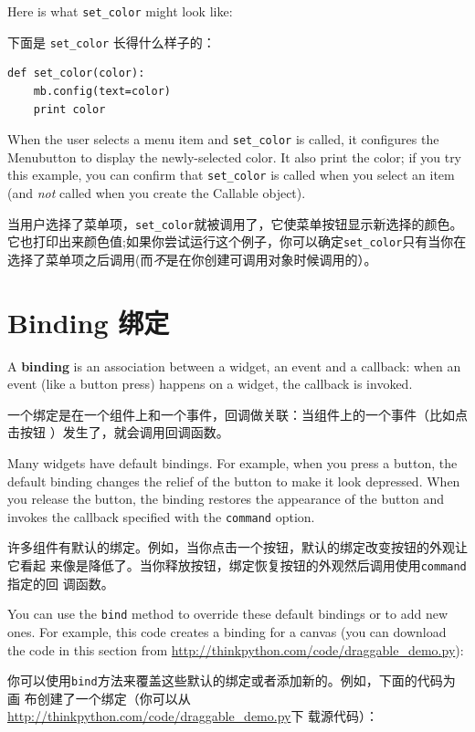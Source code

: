 \documentclass[10pt]{book}
\begin{document}
\begin{CJK}{UTF8}{gbsn}
Here is what \verb"set_color" might look like:

下面是 \verb"set_color" 长得什么样子的：

\begin{verbatim}
def set_color(color):
    mb.config(text=color)
    print color
\end{verbatim}
%
When the user selects a menu item and \verb"set_color" is called,
it configures the Menubutton to display the newly-selected color.
It also print the color; if you try this example, you can confirm that
\verb"set_color" is called when you select an item (and {\em not}
called when you create the Callable object).

当用户选择了菜单项，\verb"set_color"就被调用了，它使菜单按钮显示新选择的颜色。
它也打印出来颜色值;如果你尝试运行这个例子，你可以确定\verb"set_color"只有当你在
选择了菜单项之后调用(而{\em 不}是在你创建可调用对象时候调用的）。


\section{Binding 绑定}

A {\bf binding} is an association between a widget, an event and a
callback: when an event (like a button press) happens on a widget, the
callback is invoked.

一个绑定是在一个组件上和一个事件，回调做关联：当组件上的一个事件（比如点击按钮
）发生了，就会调用回调函数。

Many widgets have default bindings.  For example, when you press
a button, the default binding changes the relief of the button
to make it look depressed.  When you release the button, the
binding restores the appearance of the button and invokes the
callback specified with the {\tt command} option.

许多组件有默认的绑定。例如，当你点击一个按钮，默认的绑定改变按钮的外观让它看起
来像是降低了。当你释放按钮，绑定恢复按钮的外观然后调用使用{\tt command}指定的回
调函数。

You can use the {\tt bind} method to override these default
bindings or to add new ones.  For example, this code creates a
binding for a canvas (you can download the code in this
section from \url{http://thinkpython.com/code/draggable_demo.py}):

你可以使用{\tt bind}方法来覆盖这些默认的绑定或者添加新的。例如，下面的代码为画
布创建了一个绑定（你可以从\url{http://thinkpython.com/code/draggable_demo.py}下
载源代码）：


\end{CJK}
\end{document}
